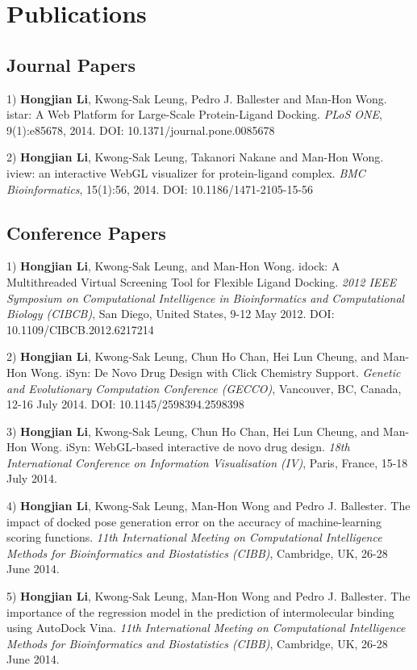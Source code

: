 \chapter{Publications}

\section{Journal Papers}

1) \textbf{Hongjian Li}, Kwong-Sak Leung, Pedro J. Ballester and Man-Hon Wong. istar: A Web Platform for Large-Scale Protein-Ligand Docking. \textit{PLoS ONE}, 9(1):e85678, 2014. DOI: 10.1371/journal.pone.0085678

2) \textbf{Hongjian Li}, Kwong-Sak Leung, Takanori Nakane and Man-Hon Wong. iview: an interactive WebGL visualizer for protein-ligand complex. \textit{BMC Bioinformatics}, 15(1):56, 2014. DOI: 10.1186/1471-2105-15-56

\section{Conference Papers}

1) \textbf{Hongjian Li}, Kwong-Sak Leung, and Man-Hon Wong. idock: A Multithreaded Virtual Screening Tool for Flexible Ligand Docking. \textit{2012 IEEE Symposium on Computational Intelligence in Bioinformatics and Computational Biology (CIBCB)}, San Diego, United States, 9-12 May 2012. DOI: 10.1109/CIBCB.2012.6217214

2) \textbf{Hongjian Li}, Kwong-Sak Leung, Chun Ho Chan, Hei Lun Cheung, and Man-Hon Wong. iSyn: De Novo Drug Design with Click Chemistry Support. \textit{Genetic and Evolutionary Computation Conference (GECCO)}, Vancouver, BC, Canada, 12-16 July 2014. DOI: 10.1145/2598394.2598398

3) \textbf{Hongjian Li}, Kwong-Sak Leung, Chun Ho Chan, Hei Lun Cheung, and Man-Hon Wong. iSyn: WebGL-based interactive de novo drug design. \textit{18th International Conference on Information Visualisation (IV)}, Paris, France, 15-18 July 2014.

4) \textbf{Hongjian Li}, Kwong-Sak Leung, Man-Hon Wong and Pedro J. Ballester. The impact of docked pose generation error on the accuracy of machine-learning scoring functions. \textit{11th International Meeting on Computational Intelligence Methods for Bioinformatics and Biostatistics (CIBB)}, Cambridge, UK, 26-28 June 2014.

5) \textbf{Hongjian Li}, Kwong-Sak Leung, Man-Hon Wong and Pedro J. Ballester. The importance of the regression model in the prediction of intermolecular binding using AutoDock Vina. \textit{11th International Meeting on Computational Intelligence Methods for Bioinformatics and Biostatistics (CIBB)}, Cambridge, UK, 26-28 June 2014.

\chapterend
